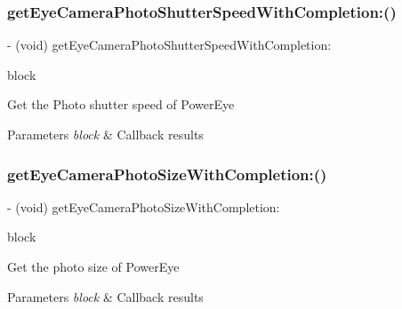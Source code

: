 \subsubsection{\texorpdfstring{get\+Eye\+Camera\+Photo\+Shutter\+Speed\+With\+Completion\+:()}{getEyeCameraPhotoShutterSpeedWithCompletion:()}}
{\footnotesize\ttfamily -\/ (void) get\+Eye\+Camera\+Photo\+Shutter\+Speed\+With\+Completion\+: \begin{DoxyParamCaption}\item[{(void($^\wedge$)(P\+V\+Camera\+Photo\+Shutter\+Speed shutter\+Speed, N\+S\+Error $\ast$\hyperlink{group___p_v_s_d_k___c_o_r_e___a_p_i___m_o_u_n_t_c_o_n_t_r_o_l_ga5a1de33b230662127568783314b4a54d}{\+\_\+\+Nullable} error))}]{block }\end{DoxyParamCaption}}

Get the Photo shutter speed of Power\+Eye


\begin{DoxyParams}{Parameters}
{\em block} & Callback results \\
\hline
\end{DoxyParams}
\mbox{\label{interface_p_v_camera_ad9e7476572492aade9c9e124dbbefbca}} 
\subsubsection{\texorpdfstring{get\+Eye\+Camera\+Photo\+Size\+With\+Completion\+:()}{getEyeCameraPhotoSizeWithCompletion:()}}
{\footnotesize\ttfamily -\/ (void) get\+Eye\+Camera\+Photo\+Size\+With\+Completion\+: \begin{DoxyParamCaption}\item[{(void($^\wedge$)(P\+V\+Camera\+Photo\+Size photo\+Size, N\+S\+Error $\ast$\hyperlink{group___p_v_s_d_k___c_o_r_e___a_p_i___m_o_u_n_t_c_o_n_t_r_o_l_ga5a1de33b230662127568783314b4a54d}{\+\_\+\+Nullable} error))}]{block }\end{DoxyParamCaption}}

Get the photo size of Power\+Eye


\begin{DoxyParams}{Parameters}
{\em block} & Callback results \\
\hline
\end{DoxyParams}
\mbox{\label{interface_p_v_camera_a80b5e84ff542ff2258424319034e8929}} 
